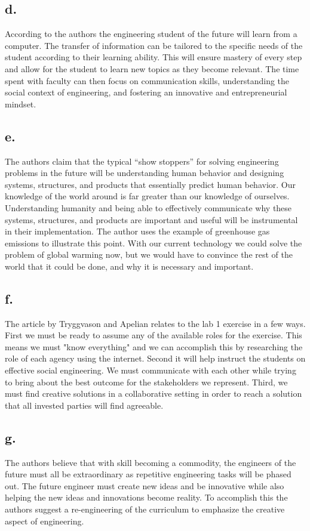 \documentclass[12pt]{article}
\renewcommand{\=}[1]{\stackrel{#1}{=}} %
\theoremstyle{definition}
\theoremstyle{remark}
\begin{document}
\subsection{d.}
According to the authors the engineering student of the future will learn from a computer. The transfer of information can be tailored to the specific needs of the student according to their learning ability. This will ensure mastery of every step and allow for the student to learn new topics as they become relevant. The time spent with faculty can then focus on communication skills, understanding the social context of engineering, and fostering an innovative and entrepreneurial mindset.

\subsection{e.}
The authors claim that the typical “show stoppers” for solving engineering problems in the future will be understanding human behavior and designing systems, structures, and products that essentially predict human behavior. Our knowledge of the world around is far greater than our knowledge of ourselves. Understanding humanity and being able to effectively communicate why these systems, structures, and products are important and useful will be instrumental in their implementation. The author uses the example of greenhouse gas emissions to illustrate this point. With our current technology we could solve the problem of global warming now, but we would have to convince the rest of the world that it could be done, and why it is necessary and important.

\subsection{f.}
The article by Tryggvason and Apelian relates to the lab 1 exercise in a few ways. First we must be ready to assume any of the available roles for the exercise. This means we must "know everything" and we can accomplish this by researching the role of each agency using the internet. Second it will help instruct the students on effective social engineering. We must communicate with each other while trying to bring about the best outcome for the stakeholders we represent. Third, we must find creative solutions in a collaborative setting in order to reach a solution that all invested parties will find agreeable.

\subsection{g.}
The authors believe that with skill becoming a commodity, the engineers of the future must all be extraordinary as repetitive engineering tasks will be phased out. The future engineer must create new ideas and be innovative while also helping the new ideas and innovations become reality. To accomplish this the authors suggest a re-engineering of the curriculum to emphasize the creative aspect of engineering.
\end{document}
